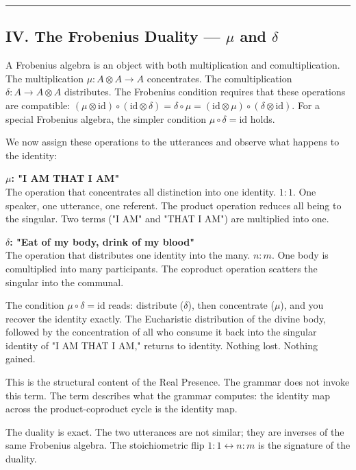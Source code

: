 \documentclass[12pt,a4paper]{article}
\begin{document}
\begin{center}
\rule{0.5\textwidth}{0.4pt}
\end{center}

\subsection{IV. The Frobenius Duality --- $\mu$ and $\delta$}

A Frobenius algebra is an object with both multiplication and comultiplication. The multiplication $\mu: A \otimes A \to A$ concentrates. The comultiplication $\delta: A \to A \otimes A$ distributes. The Frobenius condition requires that these operations are compatible: $(\mu \otimes \text{id}) \circ (\text{id} \otimes \delta) = \delta \circ \mu = (\text{id} \otimes \mu) \circ (\delta \otimes \text{id})$. For a special Frobenius algebra, the simpler condition $\mu \circ \delta = \text{id}$ holds.

We now assign these operations to the utterances and observe what happens to the identity:

\textbf{$\mu$: "I AM THAT I AM"} \\
The operation that concentrates all distinction into one identity. $1{:}1$. One speaker, one utterance, one referent. The product operation reduces all being to the singular. Two terms ("I AM" and "THAT I AM") are multiplied into one.

\textbf{$\delta$: "Eat of my body, drink of my blood"} \\
The operation that distributes one identity into the many. $n{:}m$. One body is comultiplied into many participants. The coproduct operation scatters the singular into the communal.

The condition $\mu \circ \delta = \text{id}$ reads: distribute ($\delta$), then concentrate ($\mu$), and you recover the identity exactly. The Eucharistic distribution of the divine body, followed by the concentration of all who consume it back into the singular identity of "I AM THAT I AM," returns to identity. Nothing lost. Nothing gained.

This is the structural content of the Real Presence. The grammar does not invoke this term. The term describes what the grammar computes: the identity map across the product-coproduct cycle is the identity map.

The duality is exact. The two utterances are not similar; they are inverses of the same Frobenius algebra. The stoichiometric flip $1{:}1 \leftrightarrow n{:}m$ is the signature of the duality.
\end{document}
